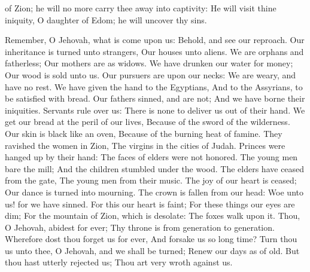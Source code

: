 of Zion; he will no more carry thee away into captivity: He will visit thine iniquity, O daughter of Edom; he will uncover thy sins. 

Remember, O Jehovah, what is come upon us: Behold, and see our reproach.  Our inheritance is turned unto strangers, Our houses unto aliens.  We are orphans and fatherless; Our mothers are as widows.  We have drunken our water for money; Our wood is sold unto us.  Our pursuers are upon our necks: We are weary, and have no rest.  We have given the hand to the Egyptians, And to the Assyrians, to be satisfied with bread.  Our fathers sinned, and are not; And we have borne their iniquities.  Servants rule over us: There is none to deliver us out of their hand.  We get our bread at the peril of our lives, Because of the sword of the wilderness.  Our skin is black like an oven, Because of the burning heat of famine.  They ravished the women in Zion, The virgins in the cities of Judah.  Princes were hanged up by their hand: The faces of elders were not honored.  The young men bare the mill; And the children stumbled under the wood.  The elders have ceased from the gate, The young men from their music.  The joy of our heart is ceased; Our dance is turned into mourning.  The crown is fallen from our head: Woe unto us! for we have sinned.  For this our heart is faint; For these things our eyes are dim;  For the mountain of Zion, which is desolate: The foxes walk upon it.  Thou, O Jehovah, abidest for ever; Thy throne is from generation to generation.  Wherefore dost thou forget us for ever, And forsake us so long time?  Turn thou us unto thee, O Jehovah, and we shall be turned; Renew our days as of old.  But thou hast utterly rejected us; Thou art very wroth against us. 
